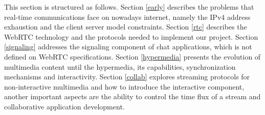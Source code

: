  This section is structured as follows.
 Section \ref{early} describes the problems that real-time communications face on nowadays internet, namely the \ac{IPv4} address exhaustion and the client server model constraints. 
 Section \ref{rtc} describes the \ac{WebRTC} technology and the protocols needed to implement our project. 
 Section \ref{signaling} addresses the signaling component of chat applications, which is not defined on \ac{WebRTC} specifications. 
 Section \ref{hypermedia} presents the evolution of multimedia content until the hypermedia, its capabilities, synchronization mechanisms and interactivity. 
 Section \ref{collab} explores streaming protocols for non-interactive multimedia and how to introduce the interactive component, another important aspects are the ability to control the time flux of a stream and collaborative application development.
        
